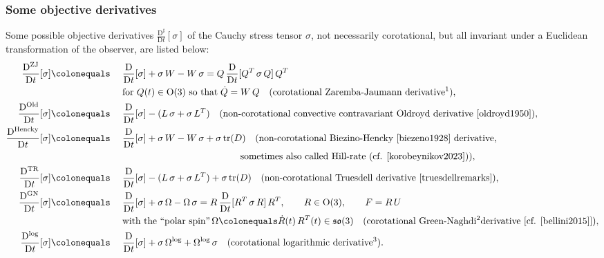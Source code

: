 \documentclass[10pt]{article}
\numberwithin{theoremCounter}{section}
\theoremstyle{plain}
\theoremstyle{definition}
\newcommand{\OO}{{\rm O}}
\newcommand{\DD}{\mathrm{D}}
\DeclareMathOperator{\tr}{tr}
\DeclareMathOperator{\Old}{Old}
\DeclareMathOperator{\ZJ}{ZJ}
\DeclareMathOperator{\GN}{GN}
\DeclareMathOperator{\TR}{TR}
\def\tr{\textnormal{tr}}
\numberwithin{equation}{section}
\begin{document}
\begin{appendix}
\subsubsection{Some objective derivatives}
%
Some possible objective derivatives $\frac{\DD^{\sharp}}{\DD t}[\sigma]$ of the Cauchy stress tensor $\sigma$, not necessarily corotational, but all invariant under a Euclidean transformation of the observer, are listed below:
	\begin{alignat}{2}
	\frac{\DD^{\ZJ}}{\DD t}[\sigma] &\colonequals && \; \frac{\DD}{\DD t}[\sigma] + \sigma \, W - W \, \sigma = Q \, \frac{\DD}{\DD t}[Q^T \, \sigma \, Q] \, Q^T \label{ZJrate01} \\
	& &&\; \textnormal{for $Q(t) \in \OO(3)$ so that} \; \dot{Q}=W\, Q \quad (\textnormal{corotational Zaremba-Jaumann derivative\footnotemark}), \notag \\
	\frac{\DD^{\Old}}{\DD t}[\sigma] &\colonequals &&\; \frac{\DD}{\DD t}[\sigma] - (L \, \sigma + \sigma \, L^T) \quad \textnormal{(non-corotational convective contravariant Oldroyd derivative \cite{oldroyd1950})}, \notag \\
	\frac{\DD^{\textnormal{Hencky}}}{\DD t}[\sigma] &\colonequals &&\; \frac{\DD}{\DD t}[\sigma] + \sigma \, W - W \, \sigma + \sigma \, \tr(D) \quad \textnormal{(non-corotational Biezino-Hencky \cite{biezeno1928} derivative,} \\
	& &&\hspace{4.5cm} \textnormal{sometimes also called Hill-rate (cf. \cite{korobeynikov2023})),} \notag \\
	\frac{\DD^{\TR}}{\DD t}[\sigma] &\colonequals &&\; \frac{\DD}{\DD t}[\sigma] - (L \, \sigma + \sigma \, L^T) + \sigma \, \tr(D) \quad \textnormal{(non-corotational Truesdell derivative \cite[eq.~3]{truesdellremarks}),} \notag \\
	\frac{\DD^{\GN}}{\DD t}[\sigma] &\colonequals &&\; \frac{\DD}{\DD t}[\sigma] + \sigma \, \Omega - \Omega \, \sigma = R \, \frac{\DD}{\DD t}[R^T \, \sigma \, R] \, R^T, \qquad R \in \OO(3), \qquad F = R \, U \notag \\
	& &&\; \textnormal{with the ``polar spin''} \, \Omega \colonequals \dot{R}(t) \, R^T(t) \in \mathfrak{so}(3) \quad \textnormal{(corotational Green-Naghdi\footnotemark derivative [cf. \cite{bellini2015}])}, \notag \\
	\frac{\DD^{\log}}{\DD t}[\sigma] &\colonequals &&\; \frac{\DD}{\DD t}[\sigma] + \sigma \, \Omega^{\log} + \Omega^{\log} \, \sigma \quad \textnormal{(corotational logarithmic derivative\footnotemark)}. \notag

\end{alignat}
\end{appendix}
\end{document}
